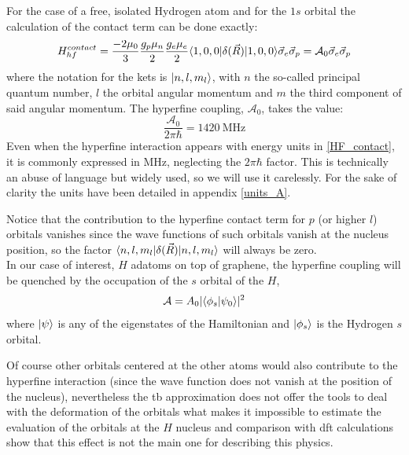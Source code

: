For the case of a free, isolated Hydrogen atom and for the $1s$ orbital the calculation of the contact term can be done exactly:
\begin{equation}
H^{contact}_{hf} =
\frac{-2\mu_0}{3}\frac{g_{p}\mu_{n}}{2}
\frac{g_{e}\mu_{e}}{2} \langle1,0,0|\delta(\vec{R})
|1,0,0\rangle  \vec{\sigma}_e\vec{\sigma}_p =
\mathcal{A}_{0}\vec{\sigma}_e\vec{\sigma}_p
\label{HF_contact}
\end{equation}
where the notation for the kets is $|n,l,m_{l}\rangle$, with $n$ the so-called principal quantum number, $l$ the orbital angular momentum and $m$ the third component of said angular momentum. The hyperfine coupling, $\mathcal{A}_{0}$, takes the value:
\begin{equation}
  \frac{\mathcal{A}_0}{2\pi\hbar} = \SI{1420}{\MHz}
\end{equation}
Even when the hyperfine interaction appears with energy units in \eqref{HF_contact}, it is commonly expressed in $\si{\MHz}$, neglecting the $2\pi\hbar$ factor. This is technically an abuse of language but widely used, so we will use it carelessly. For the sake of clarity the units have been detailed in appendix \ref{units_A}.

Notice that the contribution to the hyperfine contact term for $p$ (or higher $l$) orbitals vanishes since the wave functions of such orbitals vanish at the nucleus position, so the factor $\langle n,l,m_{l}|\delta(\vec{R})|n,l,m_{l}\rangle$ will always be zero.\\

In our case of interest, $H$ adatoms on top of graphene, the hyperfine coupling will be quenched by the occupation of the $s$ orbital of the $H$,
\begin{equation}
  \mathcal{A} = A_0|\langle\phi_s|\psi_0\rangle|^2
\end{equation}
where $|\psi\rangle$ is any of the eigenstates of the Hamiltonian and $|\phi_s\rangle$ is the Hydrogen $s$ orbital.

Of course other orbitals centered at the other atoms would also contribute to the hyperfine interaction (since the wave function does not vanish at the position of the nucleus), nevertheless the \ac{tb} approximation does not offer the tools to deal with the deformation of the orbitals what makes it impossible to estimate the evaluation of the orbitals at the $H$ nucleus and comparison with \ac{dft} calculations show that this effect is not the main one for describing this physics\cite{Ranjbar2010}.

